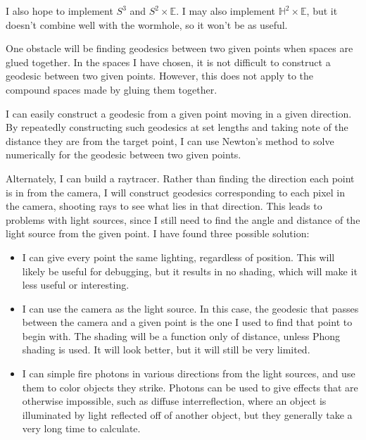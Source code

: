 \documentclass[12pt]{amsart}
\begin{document}
I also hope to implement $S^3$ and $S^2 \times \mathbb{E}$. I may also implement $\mathbb{H}^2 \times \mathbb{E}$, but it doesn't combine well with the wormhole, so it won't be as useful.


One obstacle will be finding geodesics between two given points when spaces are glued together. In the spaces I have chosen, it is not difficult to construct a geodesic between two given points. However, this does not apply to the compound spaces made by gluing them together.

I can easily construct a geodesic from a given point moving in a given direction. By repeatedly constructing such geodesics at set lengths and taking note of the distance they are from the target point, I can use Newton's method to solve numerically for the geodesic between two given points.

Alternately, I can build a raytracer. Rather than finding the direction each point is in from the camera, I will construct geodesics corresponding to each pixel in the camera, shooting rays to see what lies in that direction. This leads to problems with light sources, since I still need to find the angle and distance of the light source from the given point. I have found three possible solution:

\begin{itemize}

\item I can give every point the same lighting, regardless of position. This will likely be useful for debugging, but it results in no shading, which will make it less useful or interesting.

\item I can use the camera as the light source. In this case, the geodesic that passes between the camera and a given point is the one I used to find that point to begin with. The shading will be a function only of distance, unless Phong shading is used. It will look better, but it will still be very limited.

\item I can simple fire photons in various directions from the light sources, and use them to color objects they strike. Photons can be used to give effects that are otherwise impossible, such as diffuse interreflection, where an object is illuminated by light reflected off of another object, but they generally take a very long time to calculate.

\end{itemize}
\end{document}
